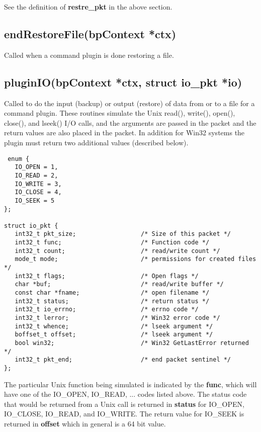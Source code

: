 See the definition of {\bf restre\_pkt} in the above section.

\subsection{endRestoreFile(bpContext *ctx)}
Called when a command plugin is done restoring a file.

\subsection{pluginIO(bpContext *ctx, struct io\_pkt *io)}
Called to do the input (backup) or output (restore) of data from or to a file
for a command plugin. These routines simulate the Unix read(), write(), open(),
close(), and lseek() I/O calls, and the arguments are passed in the packet and
the return values are also placed in the packet.  In addition for Win32 systems
the plugin must return two additional values (described below).

\begin{verbatim}
 enum {
   IO_OPEN = 1,
   IO_READ = 2,
   IO_WRITE = 3,
   IO_CLOSE = 4,
   IO_SEEK = 5
};

struct io_pkt {
   int32_t pkt_size;                  /* Size of this packet */
   int32_t func;                      /* Function code */
   int32_t count;                     /* read/write count */
   mode_t mode;                       /* permissions for created files */
   int32_t flags;                     /* Open flags */
   char *buf;                         /* read/write buffer */
   const char *fname;                 /* open filename */
   int32_t status;                    /* return status */
   int32_t io_errno;                  /* errno code */
   int32_t lerror;                    /* Win32 error code */
   int32_t whence;                    /* lseek argument */
   boffset_t offset;                  /* lseek argument */
   bool win32;                        /* Win32 GetLastError returned */
   int32_t pkt_end;                   /* end packet sentinel */
};
\end{verbatim}

The particular Unix function being simulated is indicated by the {\bf func},
which will have one of the IO\_OPEN, IO\_READ, ... codes listed above.  The
status code that would be returned from a Unix call is returned in {\bf status}
for IO\_OPEN, IO\_CLOSE, IO\_READ, and IO\_WRITE. The return value for IO\_SEEK
is returned in {\bf offset} which in general is a 64 bit value.

